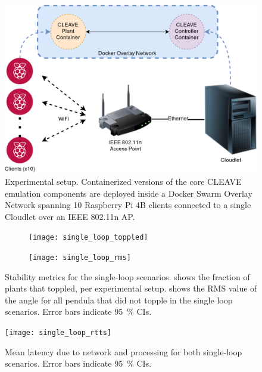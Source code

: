 \begin{figure}
    \centering
    \includegraphics[width=.95\columnwidth]{images/CLEAVE_experiment_setup}
    \caption{Experimental setup. Containerized versions of the core CLEAVE emulation components are deployed inside a Docker Swarm Overlay Network spanning \num{10} Raspberry Pi 4B clients connected to a single Cloudlet over an IEEE 802.11n \ac{AP}.}\label{fig:cleave:expsetup}
\end{figure}

\begin{figure}[h]
    \centering
    \begin{subfigure}[t]{.5\textwidth}
        \centering
        \texttt{[image: single\_loop\_toppled]}
        \caption{}%
        \label{fig:single:topple}
    \end{subfigure}%
    \begin{subfigure}[t]{.5\textwidth}
        \centering
        \texttt{[image: single\_loop\_rms]}
        \caption{}\label{fig:single:rms}
    \end{subfigure}%
    \caption[caption]{
        Stability metrics for the single-loop scenarios.
         shows the fraction of plants that toppled, per experimental setup.
         shows the \ac{RMS} value of the angle for all pendula that did not topple in the single loop scenarios.
        Error bars indicate \SI{95}{\percent} \acp{CI}.
        }%
    \label{fig:single:stability}
\end{figure}

\begin{figure}
    \centering
    \texttt{[image: single\_loop\_rtts]}
    \caption{
        Mean latency due to network and processing for both single-loop scenarios.
        Error bars indicate \SI{95}{\percent} \acp{CI}.
    }\label{fig:single:rtt}
\end{figure}

